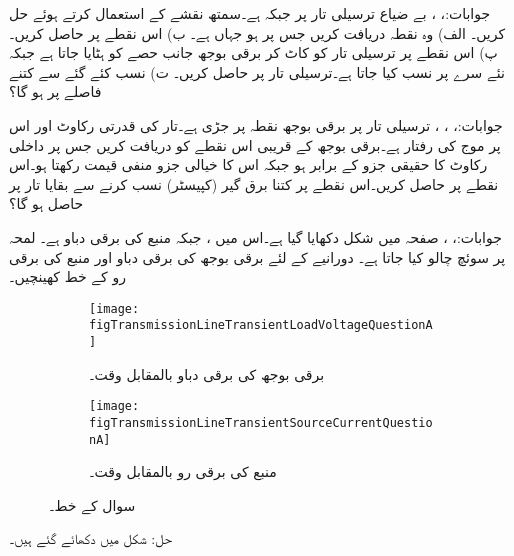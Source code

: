 جوابات:، ، 
بے ضیاع ترسیلی تار پر  جبکہ  ہے۔سمتھ نقشے کے استعمال کرتے ہوئے حل کریں۔ الف) وہ نقطہ دریافت کریں جس پر  ہو جہاں  ہے۔ ب) اس نقطے پر  حاصل کریں۔ پ) اس نقطے پر ترسیلی تار کو کاٹ کر برقی بوجھ جانب حصے کو ہٹایا جاتا ہے جبکہ نئے سرے پر   نسب کیا جاتا ہے۔ترسیلی تار پر  حاصل کریں۔ ت) نسب کئے گئے  سے کتنے فاصلے پر  ہو گا؟

جوابات:، ، ، 
ترسیلی تار پر  برقی بوجھ  نقطہ   پر جڑی ہے۔تار کی قدرتی رکاوٹ  اور اس پر موج کی رفتار  ہے۔برقی بوجھ کے قریبی اس نقطے کو دریافت کریں جس پر داخلی رکاوٹ کا حقیقی جزو  کے برابر ہو جبکہ اس کا خیالی جزو منفی قیمت رکھتا ہو۔اس نقطے پر 
 حاصل کریں۔اس نقطے پر کتنا برق گیر (کپیسٹر)  نسب کرنے سے بقایا تار پر  حاصل ہو گا؟ 

جوابات:، ، 
صفحہ  میں شکل  دکھایا گیا ہے۔اس میں ،  جبکہ منبع کی برقی دباو  ہے۔ لمحہ  پر سوئچ چالو کیا جاتا ہے۔ دورانیے کے لئے برقی بوجھ  کی برقی دباو اور  منبع کی برقی رو کے خط کھینچیں۔

\begin{figure}
\centering
\begin{subfigure}{0.8\textwidth}
\centering
\texttt{[image: figTransmissionLineTransientLoadVoltageQuestionA]}
\caption{ برقی بوجھ کی برقی دباو بالمقابل وقت۔}
\label{شکل_ترسیلی_جواب_سوال_الف}
\end{subfigure}%

\begin{subfigure}{0.8\textwidth}
\centering
\texttt{[image: figTransmissionLineTransientSourceCurrentQuestionA]}
\caption{منبع کی برقی رو بالمقابل وقت۔}
\label{شکل_ترسیلی_جواب_منبع_رو_سوال_الف}
\end{subfigure}%
\caption{سوال  کے خط۔}
\label{شکل_سوال_ترسیلی_سوال_الف}
\end{figure}
حل: شکل  میں دکھائے گئے ہیں۔

